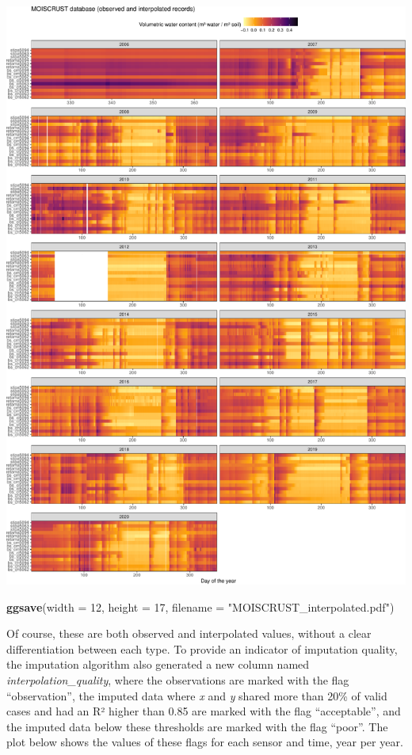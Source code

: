 \documentclass[]{article}
\newenvironment{Shaded}{\begin{snugshade}}{\end{snugshade}}
\newcommand{\DataTypeTok}[1]{\textcolor[rgb]{0.13,0.29,0.53}{#1}}
\newcommand{\DecValTok}[1]{\textcolor[rgb]{0.00,0.00,0.81}{#1}}
\newcommand{\KeywordTok}[1]{\textcolor[rgb]{0.13,0.29,0.53}{\textbf{#1}}}
\newcommand{\NormalTok}[1]{#1}
\newcommand{\StringTok}[1]{\textcolor[rgb]{0.31,0.60,0.02}{#1}}
\begin{document}
\includegraphics{moiscrust_files/figure-latex/unnamed-chunk-29-1.pdf}

\begin{Shaded}
\begin{Highlighting}[]
\KeywordTok{ggsave}\NormalTok{(}\DataTypeTok{width =} \DecValTok{12}\NormalTok{, }\DataTypeTok{height =} \DecValTok{17}\NormalTok{, }\DataTypeTok{filename =} \StringTok{"MOISCRUST_interpolated.pdf"}\NormalTok{)}
\end{Highlighting}
\end{Shaded}

Of course, these are both observed and interpolated values, without a
clear differentiation between each type. To provide an indicator of
imputation quality, the imputation algorithm also generated a new column
named \emph{interpolation\_quality}, where the observations are marked
with the flag ``observation'', the imputed data where \emph{x} and
\emph{y} shared more than 20\% of valid cases and had an R² higher than
0.85 are marked with the flag ``acceptable'', and the imputed data below
these thresholds are marked with the flag ``poor''. The plot below shows
the values of these flags for each sensor and time, year per year.
\end{document}
